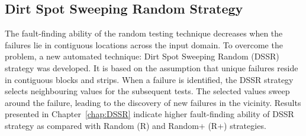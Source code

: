 \subsection{Dirt Spot Sweeping Random Strategy}

The fault-finding ability of the random testing technique decreases when the failures lie in contiguous locations across the input domain. To overcome the problem, a new automated technique: Dirt Spot Sweeping Random (DSSR) strategy was developed. It is based on the assumption that unique failures reside in contiguous blocks and strips. When a failure is identified, the DSSR strategy selects neighbouring values for the subsequent tests. The selected values sweep around the failure, leading to the discovery of new failures in the vicinity. Results presented in Chapter~\ref{chap:DSSR} indicate higher fault-finding ability of DSSR strategy as compared with Random (R) and Random+ (R+) strategies.

